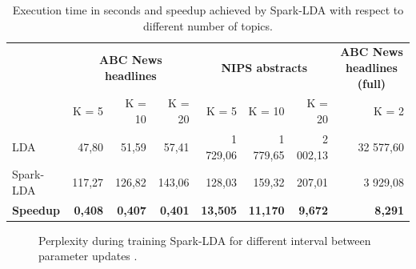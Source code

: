 \documentclass[journal]{IEEEtran}
\begin{document}
\begin{table}[t]
\centering
\caption{Execution time in seconds and speedup achieved by Spark-LDA with respect to different number of topics.}
\begin{tabular}{lrrrrrrr} \toprule
                 & \multicolumn{3}{c}{\textbf{ABC News headlines}} & \multicolumn{3}{c}{\textbf{NIPS abstracts}}        & \multicolumn{1}{c}{\textbf{ABC News headlines (full)}} \\
                 & K = 5             & K = 10           & K = 20           & K = 5           & K = 10          & K = 20         & K = 2                                           \\ \midrule
LDA              & 47,80             & 51,59            & 57,41            & 1 729,06        & 1 779,65        & 2 002,13       & 32 577,60                                       \\
Spark-LDA        & 117,27            & 126,82           & 143,06           & 128,03          & 159,32          & 207,01         & 3 929,08                                        \\ \midrule
\textbf{Speedup} & \textbf{0,408}    & \textbf{0,407}   & \textbf{0,401}   & \textbf{13,505} & \textbf{11,170} & \textbf{9,672} & \textbf{8,291}  \\ \bottomrule                         
\end{tabular}
\label{tab:speedup}
\end{table}

\begin{figure}[t]
\centering
{}
\hfil
{}
\caption{Perplexity during training Spark-LDA for different interval between parameter updates .}
\label{fig_sim}
\end{figure}
\end{document}
